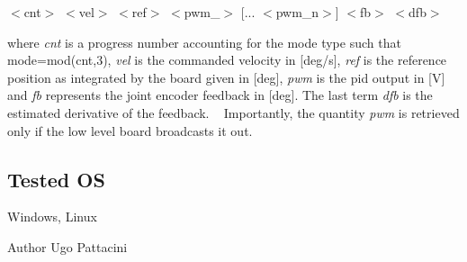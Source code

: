 $<$cnt$>$ $<$vel$>$ $<$ref$>$ $<$pwm\+\_$>$ \mbox{[}... $<$pwm\+\_\+n$>$\mbox{]} $<$fb$>$ $<$dfb$>$

where {\itshape cnt} is a progress number accounting for the mode type such that mode=mod(cnt,3), {\itshape vel} is the commanded velocity in \mbox{[}deg/s\mbox{]}, {\itshape ref} is the reference position as integrated by the board given in \mbox{[}deg\mbox{]}, {\itshape pwm} is the pid output in \mbox{[}V\mbox{]} and {\itshape fb} represents the joint encoder feedback in \mbox{[}deg\mbox{]}. The last term {\itshape dfb} is the estimated derivative of the feedback. ~\newline
 Importantly, the quantity {\itshape pwm} is retrieved only if the low level board broadcasts it out.\hypertarget{group__icub__signalScope_tested_os_sec}{}\subsection{Tested OS}\label{group__icub__signalScope_tested_os_sec}
Windows, Linux

\begin{DoxyAuthor}{Author}
Ugo Pattacini 
\end{DoxyAuthor}
